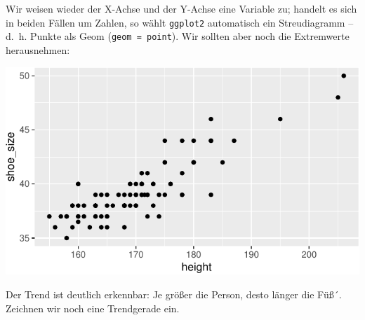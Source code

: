 \documentclass[12pt,ngerman,paper=a4,pagesize,DIV=13]{scrreprt}
\newenvironment{Shaded}{\begin{snugshade}}{\end{snugshade}}
\newcommand{\DataTypeTok}[1]{\textcolor[rgb]{0.13,0.29,0.53}{#1}}
\newcommand{\DecValTok}[1]{\textcolor[rgb]{0.00,0.00,0.81}{#1}}
\newcommand{\KeywordTok}[1]{\textcolor[rgb]{0.13,0.29,0.53}{\textbf{#1}}}
\newcommand{\NormalTok}[1]{#1}
\newcommand{\OperatorTok}[1]{\textcolor[rgb]{0.81,0.36,0.00}{\textbf{#1}}}
\newcommand{\StringTok}[1]{\textcolor[rgb]{0.31,0.60,0.02}{#1}}
\begin{document}
Wir weisen wieder der X-Achse und der Y-Achse eine Variable zu; handelt
es sich in beiden Fällen um Zahlen, so wählt \texttt{ggplot2}
automatisch ein Streudiagramm -- d.~h. Punkte als Geom
(\texttt{geom\ =\ \textquotesingle{}point\textquotesingle{}}). Wir
sollten aber noch die Extremwerte herausnehmen:

\begin{Shaded}
\end{Shaded}

\includegraphics{DatenerhebungStatistik-Uebung_files/figure-latex/unnamed-chunk-246-1.pdf}

Der Trend ist deutlich erkennbar: Je größer die Person, desto länger die
Füß´. Zeichnen wir noch eine Trendgerade ein.

\begin{Shaded}
\end{Shaded}
\end{document}
